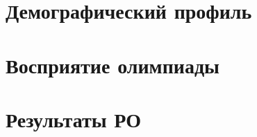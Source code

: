 \documentclass[12pt,openany]{extbook}
\begin{document}
\def\contentsname{Содержание}
\tableofcontents



% 

\chapter{Демографический профиль}


\chapter{Восприятие олимпиады}


\chapter{Результаты РО}

\end{document}
